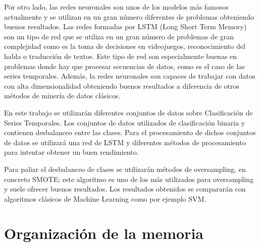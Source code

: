 Por otro lado, las redes neuronales son unos de los modelos más famosos actualmente y se utilizan en un gran número diferentes de problemas obteniendo buenos resultados. Las redes formadas por LSTM (Long Short Term Memory) son un tipo de red que se utiliza en un gran número de problemas de gran complejidad como es la toma de decisiones en videojuegos, reconocimiento del habla o traducción de textos. Este tipo de red son especialmente buenas en problemas donde hay que procesar secuencias de datos, como  es el caso de las series temporales. Además, la redes neuronales son capaces de trabajar con datos con alta dimensionalidad obteniendo buenos resultados a diferencia de otros métodos de minería de datos clásicos.\newline

En este trabajo se utilizarán diferentes conjuntos de datos sobre Clasificación de Series Temporales. Los conjuntos de datos utilizados de clasificación binaria y contienen desbalanceo entre las clases. Para el procesamiento de dichos conjuntos de datos se utilizará una red de LSTM y diferentes métodos de procesamiento para intentar obtener un buen rendimiento.\newline

Para paliar el desbalanceo de clases se utilizarán métodos de oversampling, en concreto SMOTE; este algoritmo es uno de los más utilizados para oversampling y suele ofrecer buenos resultados. Los resultados obtenidos se compararán con algoritmos clásicos de Machine Learning como por ejemplo SVM.

\section{Organización de la memoria}